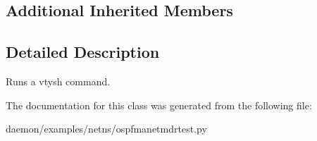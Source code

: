 \subsection*{Additional Inherited Members}


\subsection{Detailed Description}
\begin{DoxyVerb}Runs a vtysh command. \end{DoxyVerb}
 

The documentation for this class was generated from the following file\+:\begin{DoxyCompactItemize}
\item 
daemon/examples/netns/ospfmanetmdrtest.\+py\end{DoxyCompactItemize}

